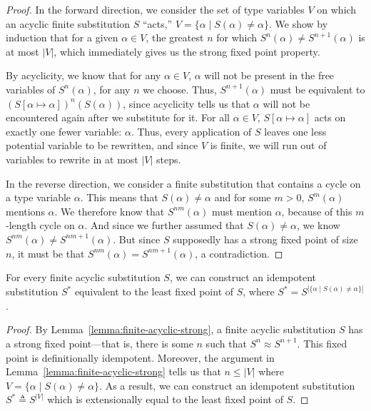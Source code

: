 \documentclass[10pt, letterpaper, oneside]{article}
\begin{document}
\begin{proof}
  In the forward direction, we consider the set of type variables \(V\) on which an acyclic finite substitution \(S\) ``acts,'' \(V = \{\alpha \mid S(\alpha) \ne \alpha\}\). We show by induction that for a given \(\alpha \in V\), the greatest \(n\) for which \(S^n(\alpha) \ne S^{n + 1}(\alpha)\) is at most \(|V|\), which immediately gives us the strong fixed point property.

  By acyclicity, we know that for any \(\alpha \in V\), \(\alpha\) will not be present in the free variables of \(S^n(\alpha)\), for any \(n\) we choose. Thus, \(S^{n + 1}(\alpha)\) must be equivalent to \((S[\alpha \mapsto \alpha])^n(S(\alpha))\), since acyclicity tells us that \(\alpha\) will not be encountered again after we substitute for it. For all \(\alpha \in V\), \(S[\alpha \mapsto \alpha]\) acts on exactly one fewer variable: \(\alpha\). Thus, every application of \(S\) leaves one less potential variable to be rewritten, and since \(V\) is finite, we will run out of variables to rewrite in at most \(|V|\) steps.

  In the reverse direction, we consider a finite substitution that contains a cycle on a type variable \(\alpha\). This means that \(S(\alpha) \ne \alpha\) and for some \(m > 0\), \(S^m(\alpha)\) mentions \(\alpha\). We therefore know that \(S^{nm}(\alpha)\) must mention \(\alpha\), because of this \(m\)-length cycle on \(\alpha\). And since we further assumed that \(S(\alpha) \ne \alpha\), we know \(S^{nm}(\alpha) \ne S^{nm + 1}(\alpha)\). But since \(S\) supposedly has a strong fixed point of size \(n\), it must be that \(S^{nm}(\alpha) = S^{nm + 1}(\alpha)\), a contradiction.
\end{proof}

\begin{corollary}
  \label{corollary:idempotize}
  For every finite acyclic substitution \(S\), we can construct an idempotent substitution \(S^\ast\) equivalent to the least fixed point of \(S\), where \(S^\ast = S^{|\{\alpha \mid S(\alpha) \ne \alpha\}|}\).
\end{corollary}

\begin{proof}
  By Lemma~\ref{lemma:finite-acyclic-strong}, a finite acyclic substitution \(S\) has a strong fixed point---that is, there is some \(n\) such that \(S^n \approx S^{n + 1}\). This fixed point is definitionally idempotent. Moreover, the argument in Lemma~\ref{lemma:finite-acyclic-strong} tells us that \(n \le |V|\) where \(V = \{\alpha \mid S(\alpha) \ne \alpha\}\). As a result, we can construct an idempotent substitution \(S^\ast \triangleq S^{|V|}\) which is extensionally equal to the least fixed point of \(S\).
\end{proof}
\end{document}
